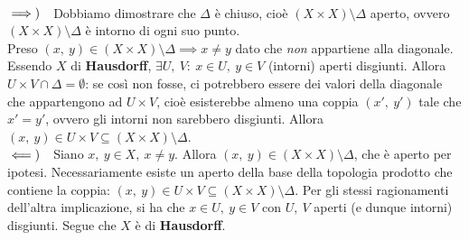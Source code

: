 \begin{demonstration}~{}\\
$\implies)\quad$Dobbiamo dimostrare che $\Delta$ è chiuso, cioè $\left(X\times X\right)\setminus \Delta$ aperto, ovvero $\left(X\times X\right)\setminus \Delta$ è intorno di ogni suo punto.\\
Preso $\left(x,\ y\right)\in \left(X\times X\right)\setminus \Delta\implies x\neq y$ dato che \textit{non} appartiene alla diagonale. Essendo $X$ di \textbf{Hausdorff}, $\exists U,\ V:\ x\in U,\ y\in V$ (intorni) aperti  disgiunti. Allora $U\times V\cap \Delta =\emptyset$: se così non fosse, ci potrebbero essere dei valori della diagonale che appartengono ad $U\times V$, cioè esisterebbe almeno una coppia $\left(x',\ y'\right)$ tale che $x'=y'$, ovvero gli intorni non sarebbero disgiunti. Allora $\left(x,\ y\right)\in U\times V\subseteq \left(X\times X\right)\setminus \Delta$.\\
$\impliedby)\quad$Siano $x,\ y\in X,\ x\neq y$. Allora $\left(x,\ y\right)\in \left(X\times X\right)\setminus \Delta$, che è aperto per ipotesi. Necessariamente esiste un aperto della base della topologia prodotto che contiene la coppia: $\left(x,\ y\right)\in U\times V\subseteq \left(X\times X\right)\setminus \Delta$. Per gli stessi ragionamenti dell'altra implicazione, si ha che $x\in U,\ y\in V$ con $U,\ V$ aperti (e dunque intorni) disgiunti. Segue che $X$ è di \textbf{Hausdorff}.
\end{demonstration}
